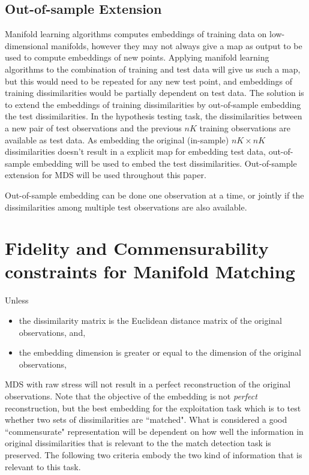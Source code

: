 \documentclass[11pt]{article} %
\begin{document}
\subsection{Out-of-sample Extension}
Manifold learning algorithms computes embeddings of training data on low-dimensional manifolds, however they may not always give a map as output  to  be used to compute embeddings of new points. Applying manifold learning algorithms to the combination  of training and test data  will give us such a map, but this would need to be repeated for any new test point, and embeddings of training dissimilarities would be  partially dependent on test data. The solution is to extend the embeddings of training dissimilarities by out-of-sample embedding the test dissimilarities. 
In the hypothesis testing task, the  dissimilarities   between a new pair of test observations and the previous $nK$ training observations are available as test data. As embedding the original (in-sample) $nK \times nK$ dissimilarities doesn't result in a explicit map for embedding test data, out-of-sample embedding will be used to embed the test dissimilarities.  Out-of-sample extension for MDS will be used throughout this paper\cite{TrossetOOS}. 

Out-of-sample embedding can be done one observation at a time, or jointly if the dissimilarities among multiple test observations are also available. 


\section{Fidelity and Commensurability constraints for Manifold Matching\label{sec:FidComm}}
Unless 
\begin{itemize}
\item the dissimilarity matrix is the Euclidean distance matrix of the original observations, and, 
\item the embedding dimension is greater or equal to the dimension of the original observations,
\end{itemize}
MDS with raw stress will not result in a perfect reconstruction  of the original observations. Note that the objective of the embedding is not \emph{perfect} reconstruction, but the best embedding for the exploitation task which is to test whether two sets of dissimilarities are ``matched". What is considered a good ``commensurate" representation will be dependent on how well the information in original dissimilarities that is relevant to the the match detection task is preserved. The following two criteria  embody the two kind of information  that is relevant to this task.
\end{document}
